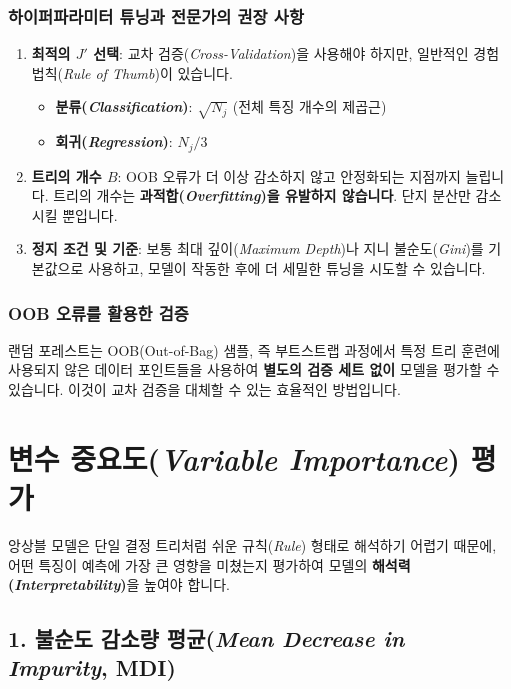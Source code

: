 \documentclass[11pt,a4paper]{book}
\theoremstyle{definition}
\begin{document}
\subsubsection*{하이퍼파라미터 튜닝과 전문가의 권장 사항}
\begin{enumerate}
    \item \textbf{최적의 $J'$ 선택}: 교차 검증(\emph{Cross-Validation})을 사용해야 하지만, 일반적인 경험 법칙(\emph{Rule of Thumb})이 있습니다.
    \begin{itemize}
        \item \textbf{분류(\emph{Classification})}: $\sqrt{N_j}$ (전체 특징 개수의 제곱근)
        \item \textbf{회귀(\emph{Regression})}: $N_j/3$
    \end{itemize}
    \item \textbf{트리의 개수 $B$}: OOB 오류가 더 이상 감소하지 않고 안정화되는 지점까지 늘립니다. 트리의 개수는 \textbf{과적합(\emph{Overfitting})을 유발하지 않습니다}. 단지 분산만 감소시킬 뿐입니다.
    \item \textbf{정지 조건 및 기준}: 보통 최대 깊이(\emph{Maximum Depth})나 지니 불순도(\emph{Gini})를 기본값으로 사용하고, 모델이 작동한 후에 더 세밀한 튜닝을 시도할 수 있습니다.
\end{enumerate}

\subsubsection*{OOB 오류를 활용한 검증}
랜덤 포레스트는 OOB(Out-of-Bag) 샘플, 즉 부트스트랩 과정에서 특정 트리 훈련에 사용되지 않은 데이터 포인트들을 사용하여 \textbf{별도의 검증 세트 없이} 모델을 평가할 수 있습니다. 이것이 교차 검증을 대체할 수 있는 효율적인 방법입니다.


\section{변수 중요도(\emph{Variable Importance}) 평가}

앙상블 모델은 단일 결정 트리처럼 쉬운 규칙(\emph{Rule}) 형태로 해석하기 어렵기 때문에, 어떤 특징이 예측에 가장 큰 영향을 미쳤는지 평가하여 모델의 \textbf{해석력(\emph{Interpretability})}을 높여야 합니다.

\subsection{1. 불순도 감소량 평균(\emph{Mean Decrease in Impurity}, MDI)}
\end{document}
